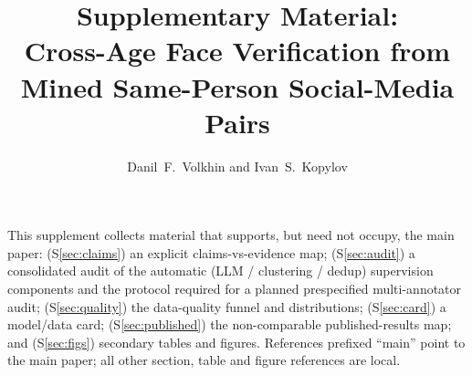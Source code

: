 \documentclass[journal]{IEEEtran}
\begin{document}
\title{Supplementary Material:\\ Cross-Age Face Verification from Mined Same-Person Social-Media Pairs}
\author{Danil~F.~Volkhin and Ivan~S.~Kopylov}
\maketitle

\noindent This supplement collects material that supports, but need not occupy, the main paper:
(S\ref{sec:claims}) an explicit claims-vs-evidence map; (S\ref{sec:audit}) a consolidated audit of
the automatic (LLM / clustering / dedup) supervision components and the protocol required for a
planned prespecified multi-annotator audit; (S\ref{sec:quality}) the data-quality funnel and
distributions; (S\ref{sec:card}) a model/data card; (S\ref{sec:published}) the non-comparable
published-results map; and (S\ref{sec:figs}) secondary tables and figures. References prefixed
``main'' point to the main paper; all other section, table and figure references are local.
\end{document}
